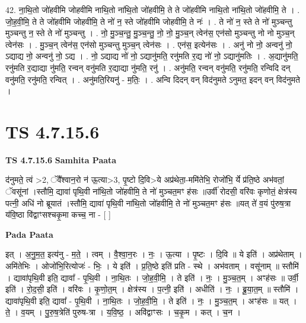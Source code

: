 \documentclass[17pt]{extarticle}
\begin{document}
42. ना॒थि॒तो जो॑हवीमि जोहवीमि नाथि॒तो ना॑थि॒तो जो॑हवीमि॒ ते ते जो॑हवीमि नाथि॒तो ना॑थि॒तो जो॑हवीमि॒ ते । . जो॒ह॒वी॒मि॒ ते ते जो॑हवीमि जोहवीमि॒ ते नो॑ न॒ स्ते जो॑हवीमि जोहवीमि॒ ते नः॑ । . ते नो॑ न॒ स्ते ते नो॑ मुञ्चन्तु मुञ्चन्तु न॒ स्ते ते नो॑ मुञ्चन्तु । . नो॒ मु॒ञ्च॒न्तु॒ मु॒ञ्च॒न्तु॒ नो॒ नो॒ मु॒ञ्च॒न् त्वेन॑स॒ एन॑सो मुञ्चन्तु नो नो मुञ्च॒न् त्वेन॑सः । . मु॒ञ्च॒न् त्वेन॑स॒ एन॑सो मुञ्चन्तु मुञ्च॒न् त्वेन॑सः । . एन॑स॒ इत्येन॑सः । . अनु॑ नो नो॒ अन्वनु॑ नो॒ ऽद्याद्य नो॒ अन्वनु॑ नो॒ ऽद्य । . नो॒ ऽद्याद्य नो॑ नो॒ ऽद्यानु॑मति॒ रनु॑मति र॒द्य नो॑ नो॒ ऽद्यानु॑मतिः । . अ॒द्यानु॑मति॒ रनु॑मति र॒द्याद्या नु॑मति॒ रन्वन् वनु॑मति र॒द्याद्या नु॑मति॒ रनु॑ । . अनु॑मति॒ रन्वन् वनु॑मति॒ रनु॑मति॒ रन्विदि दन् वनु॑मति॒ रनु॑मति॒ रन्वित् । . अनु॑मति॒रियनु॑ - म॒तिः॒ । . अन्वि दिदन् वन् विद॑नुमते ऽनुमत॒ इदन् वन् विद॑नुमते । \newline
\pagebreak
{}

\section{ TS 4.7.15.6 }

\textbf{TS 4.7.15.6 } \newline
\textbf{Samhita Paata} \newline

द॑नुमते॒ त्वं >2, ॅवै᳚श्वान॒रो न॑ ऊ॒त्या>3, पृ॒ष्टो दि॒वि>ये अप्र॑थेता॒-ममि॑तेभि॒ रोजो॑भि॒ र्ये प्र॑ति॒ष्ठे अभ॑वतां॒ ॅवसू॑नां ।स्तौमि॒ द्यावा॑ पृथि॒वी ना॑थि॒तो जो॑हवीमि॒ ते नो॑ मुञ्चत॒मꣳ ह॑सः ॥उर्वी॑ रोदसी॒ वरि॑वः कृणोतं॒ क्षेत्र॑स्य पत्नी॒ अधि॑ नो ब्रूयातं ।स्तौमि॒ द्यावा॑ पृथि॒वी ना॑थि॒तो जो॑हवीमि॒ ते नो॑ मुञ्चत॒मꣳ ह॑सः ॥यत् ते॑ व॒यं पु॑रुष॒त्रा य॑वि॒ष्ठा वि॑द्वाꣳसश्चकृ॒मा कच्च॒ ना - [  ] \newline

\textbf{Pada Paata} \newline

इत् । अ॒नु॒म॒त॒ इत्य॑नु - म॒ते॒ । त्वम् । वै॒श्वा॒न॒रः । नः॒ । ऊ॒त्या । पृ॒ष्टः । दि॒वि ॥ ये इति॑ । अप्र॑थेताम् । अमि॑तेभिः । ओजो॑भि॒रित्योजः॑ - भिः॒ । ये इति॑ । प्र॒ति॒ष्ठे इति॑ प्रति - स्थे । अभ॑वताम् । वसू॑नाम् ॥ स्तौमि॑ । द्यावा॑पृथि॒वी इति॒ द्यावा᳚ - पृ॒थि॒वी । ना॒थि॒तः । जो॒ह॒वी॒मि॒ । ते इति॑ । नः॒ । मु॒ञ्च॒त॒म् । अꣳह॑सः ॥ उर्वी॒ इति॑ । रो॒द॒सी॒ इति॑ । वरि॑वः । कृ॒णो॒त॒म् । क्षेत्र॑स्य । प॒त्नी॒ इति॑ । अधीति॑ । नः॒ । ब्रू॒या॒त॒म् ॥ स्तौमि॑ । द्यावा॑पृथि॒वी इति॒ द्यावा᳚ - पृ॒थि॒वी । ना॒थि॒तः । जो॒ह॒वी॒मि॒ । ते इति॑ । नः॒ । मु॒ञ्च॒त॒म् । अꣳह॑सः ॥ यत् । ते॒ । व॒यम् । पु॒रु॒ष॒त्रेति॑ पुरुष-त्रा । य॒वि॒ष्ठ॒ । अवि॑द्वाꣳसः । च॒कृ॒म । कत् । च॒न ।  \newline
\end{document}
